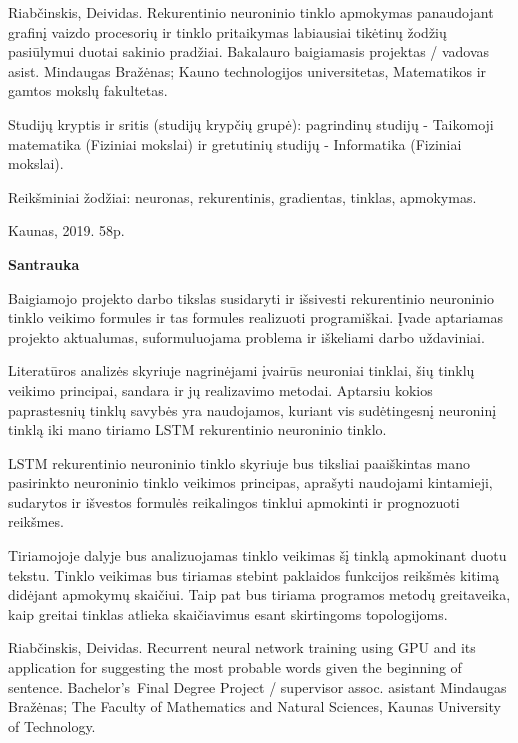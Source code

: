 Riabčinskis, Deividas. Rekurentinio neuroninio tinklo apmokymas panaudojant grafinį vaizdo procesorių ir tinklo pritaikymas labiausiai tikėtinų žodžių pasiūlymui duotai sakinio pradžiai. Bakalauro baigiamasis projektas / vadovas asist. Mindaugas Bražėnas; Kauno technologijos universitetas, Matematikos ir gamtos mokslų fakultetas.

Studijų kryptis ir sritis (studijų krypčių grupė): pagrindinų studijų - Taikomoji matematika (Fiziniai mokslai) ir gretutinių studijų - Informatika (Fiziniai mokslai).

Reikšminiai žodžiai: neuronas, rekurentinis, gradientas, tinklas, apmokymas.

Kaunas, 2019. 58p.%

\begin{center}
\textbf{Santrauka}
\end{center}

Baigiamojo projekto darbo tikslas susidaryti ir išsivesti rekurentinio neuroninio tinklo vei\-ki\-mo formules ir tas formules realizuoti programiškai. Įvade aptariamas projekto aktualumas, suformuluojama problema ir iškeliami darbo uždaviniai.

Literatūros analizės skyriuje nagrinėjami įvairūs neuroniai tinklai, šių tinklų veikimo principai, sandara ir jų realizavimo metodai. Aptarsiu kokios paprastesnių tinklų savybės yra naudojamos, kuriant vis sudėtingesnį neuroninį tinklą iki mano tiriamo LSTM rekurentinio neuroninio tinklo.

LSTM rekurentinio neuroninio tinklo skyriuje bus tiksliai paaiškintas mano pasirinkto neuroninio tinklo veikimos principas, aprašyti naudojami kintamieji, sudarytos ir išvestos formulės reikalingos tinklui apmokinti ir prognozuoti reikšmes.

Tiriamojoje dalyje bus analizuojamas tinklo veikimas šį tinklą apmokinant duotu tekstu. Tinklo veikimas bus tiriamas stebint paklaidos funkcijos reikšmės kitimą didėjant apmokymų skaičiui. Taip pat bus tiriama programos metodų greitaveika, kaip greitai tinklas atlieka skaičiavimus esant skirtingoms topologijoms.



\clearpage

Riabčinskis, Deividas. Recurrent neural network training using GPU and its application for suggesting the most probable words given the beginning of sentence. Bachelor's Final Degree Project / supervisor assoc. asistant Mindaugas Bražėnas; The Faculty of Mathematics and Natural Sciences, Kaunas University of Technology.

